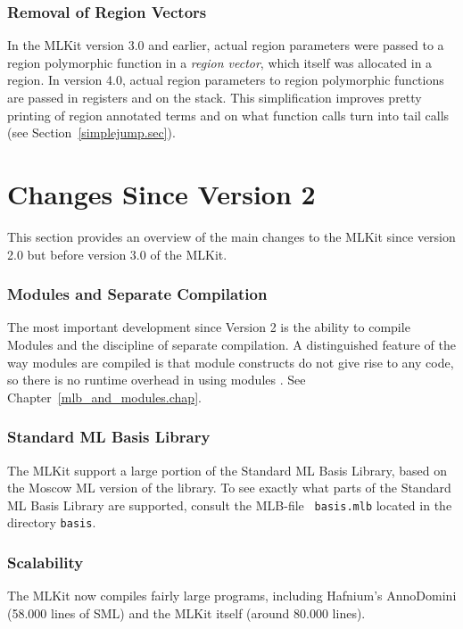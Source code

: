 \documentclass[12pt]{book}
\begin{document}
\subsubsection*{Removal of Region Vectors}
%
In the MLKit version 3.0 and earlier, actual region parameters were
passed to a region polymorphic function in a {\em region vector},
which itself was allocated in a region. In version 4.0, actual region
parameters to
%
region polymorphic functions are passed in registers and on the stack.
This simplification improves pretty printing of region annotated terms
and on what function calls turn into tail calls (see
Section~\ref{simplejump.sec}).

\section{Changes Since Version 2}
%
This section provides an overview of the main changes to the MLKit
since version 2.0 but before version 3.0 of the MLKit.

\subsubsection*{Modules and Separate Compilation}
The most important development since Version 2 is the ability to
compile Modules and the discipline of separate compilation. A
distinguished feature of the way modules are compiled is that module
constructs do not give rise to any code, so there is no runtime
overhead in using modules \cite{ElsmanICFP99,ElsmanThesis}. See
Chapter~\ref{mlb_and_modules.chap}.

\subsubsection*{Standard ML Basis Library}
The MLKit support a large portion of the  Standard ML Basis Library, based on the Moscow ML
version of the library. To see exactly what parts of the Standard ML
Basis Library are supported, consult the MLB-file {\tt
  basis.mlb} located in the directory {\tt basis}.

\subsubsection*{Scalability}
The MLKit now compiles fairly large programs, including Hafnium's AnnoDomini
(58.000 lines of SML) and the MLKit itself (around 80.000 lines).
\end{document}
